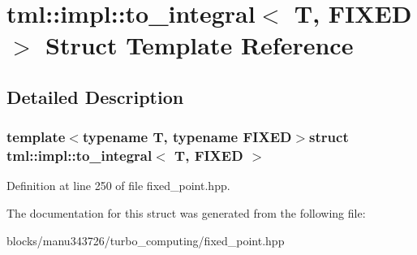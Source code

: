 \hypertarget{structtml_1_1impl_1_1to__integral}{\section{tml\+:\+:impl\+:\+:to\+\_\+integral$<$ T, F\+I\+X\+E\+D $>$ Struct Template Reference}
\label{structtml_1_1impl_1_1to__integral}
}


\subsection{Detailed Description}
\subsubsection*{template$<$typename T, typename F\+I\+X\+E\+D$>$struct tml\+::impl\+::to\+\_\+integral$<$ T, F\+I\+X\+E\+D $>$}



Definition at line 250 of file fixed\+\_\+point.\+hpp.



The documentation for this struct was generated from the following file\+:\begin{DoxyCompactItemize}
\item 
blocks/manu343726/turbo\+\_\+computing/fixed\+\_\+point.\+hpp\end{DoxyCompactItemize}
